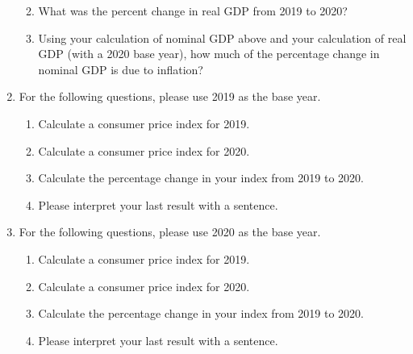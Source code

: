 \documentclass[
    letterpaper,paper=portrait,fleqn,
    DIV=16,fontsize=12pt,twoside=semi,
    parskip=full-,
    headings=standardclasses]
{scrartcl}
\begin{document}
\begin{enumerate}
\begin{enumerate}
\vfill

\vspace{-2\baselineskip}
\clearpage

\item What was the percent change in real GDP from 2019 to 2020?

\vfill

\item Using your calculation of nominal GDP above and your calculation of real GDP (with a 2020 base year), how much of the percentage change in nominal GDP is due to inflation?

\vfill

\end{enumerate}

\item For the following questions, please use 2019 as the base year.

\begin{enumerate}

\item Calculate a consumer price index for 2019.

\vfill

\item Calculate a consumer price index for 2020.

\vfill

\item Calculate the percentage change in your index from 2019 to 2020.

\vfill

\item Please interpret your last result with a sentence.

\vfill

\vspace{-2\baselineskip}

\end{enumerate}

\clearpage

\item For the following questions, please use 2020 as the base year.

\begin{enumerate}

\item Calculate a consumer price index for 2019.

\vfill

\item Calculate a consumer price index for 2020.

\vfill

\item Calculate the percentage change in your index from 2019 to 2020.

\vfill

\item Please interpret your last result with a sentence.

\vfill

\end{enumerate}

\end{enumerate}
\end{document}
